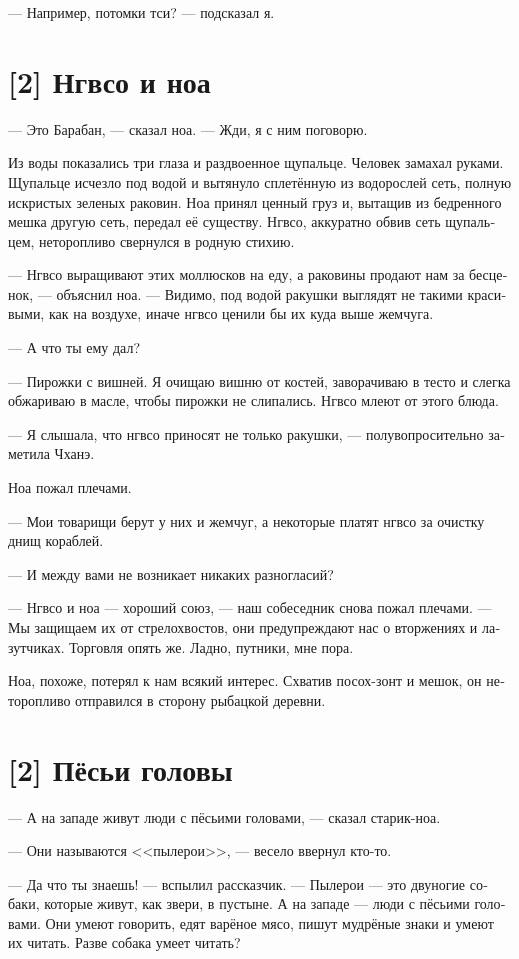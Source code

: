 \documentclass[a4paper,12pt,fleqn]{book}\usepackage{polyglossia}\setdefaultlanguage[babelshorthands=true]{russian}\setotherlanguage{english}\defaultfontfeatures{Ligatures=TeX,Mapping=tex-text}\usepackage{xcolor}\newcommand{\ml}[3]{#2}
\begin{document}
{--- Например, потомки тси? --- подсказал я.

\section{[2] Нгвсо и ноа}

--- Это Барабан, --- сказал ноа.
--- Жди, я с ним поговорю.

Из воды показались три глаза и раздвоенное щупальце.
Человек замахал руками.
Щупальце исчезло под водой и вытянуло сплетённую из водорослей сеть, полную искристых зеленых раковин.
Ноа принял ценный груз и, вытащив из бедренного мешка другую сеть, передал её существу.
Нгвсо, аккуратно обвив сеть щупальцем, неторопливо свернулся в родную стихию.

--- Нгвсо выращивают этих моллюсков на еду, а раковины продают нам за бесценок, --- объяснил ноа.
--- Видимо, под водой ракушки выглядят не такими красивыми, как на воздухе, иначе нгвсо ценили бы их куда выше жемчуга.

--- А что ты ему дал?

--- Пирожки с вишней.
Я очищаю вишню от костей, заворачиваю в тесто и слегка обжариваю в масле, чтобы пирожки не слипались.
Нгвсо млеют от этого блюда.

--- Я слышала, что нгвсо приносят не только ракушки, --- полувопросительно заметила Чханэ.

Ноа пожал плечами.

--- Мои товарищи берут у них и жемчуг, а некоторые платят нгвсо за очистку днищ кораблей.

--- И между вами не возникает никаких разногласий?

--- Нгвсо и ноа --- хороший союз, --- наш собеседник снова пожал плечами.
--- Мы защищаем их от стрелохвостов, они предупреждают нас о вторжениях и лазутчиках.
Торговля опять же.
Ладно, путники, мне пора.

Ноа, похоже, потерял к нам всякий интерес.
Схватив посох-зонт и мешок, он неторопливо отправился в сторону рыбацкой деревни.

\section{[2] Пёсьи головы}

--- А на западе живут люди с пёсьими головами, --- сказал старик-ноа.

--- Они называются <<пылерои>>, --- весело ввернул кто-то.

--- Да что ты знаешь! --- вспылил рассказчик.
--- Пылерои --- это двуногие собаки, которые живут, как звери, в пустыне.
А на западе --- люди с пёсьими головами.
Они умеют говорить, едят варёное мясо, пишут мудрёные знаки и умеют их читать.
Разве собака умеет читать?

}
\end{document}

